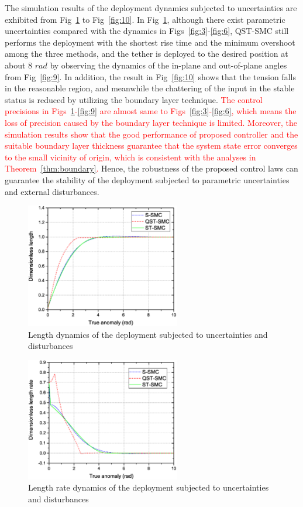 \documentclass[3p]{elsarticle}
\theoremstyle{plain}
\theoremstyle{remark}
\begin{document}
The simulation results of the deployment dynamics subjected to uncertainties are exhibited from Fig~\ref{fig:7} to Fig~\ref{fig:10}. In Fig~\ref{fig:7}, although there exist parametric uncertainties compared with the dynamics in Figs~\ref{fig:3}-\ref{fig:6}, QST-SMC still performs the deployment with the shortest rise time and the minimum overshoot among the three methods, and the tether is deployed to the desired position at about 8 $rad$ by observing the dynamics of the in-plane and out-of-plane angles from Fig~\ref{fig:9}. In addition, the result in Fig~\ref{fig:10} shows that the tension falls in the reasonable region, and meanwhile the chattering of the input in the stable status is reduced by utilizing the boundary layer technique. \textcolor{red}{The control precisions in Figs~\ref{fig:7}-\ref{fig:9} are almost same to Figs~\ref{fig:3}-\ref{fig:6}, which means the loss of precision caused by the boundary layer technique is limited. Moreover, the simulation results show that the good performance of proposed controller and the suitable boundary layer thickness guarantee that the system state error converges to the small vicinity of origin, which is consistent with the analyses in Theorem~\ref{thm:boundary}.} Hence, the robustness of the proposed control laws can guarantee the stability of the deployment subjected to parametric uncertainties and external disturbances.
\begin{figure}
\centering
\includegraphics[width=0.6\textwidth]{paper4_fig7_20161025.eps}
\caption{Length dynamics of the deployment subjected to uncertainties and disturbances}
\label{fig:7}
\end{figure}
\begin{figure}
\centering
\includegraphics[width=0.6\textwidth]{paper4_fig8_20161025.eps}
\caption{Length rate dynamics of the deployment subjected to uncertainties and disturbances}
\label{fig:8}
\end{figure}
\end{document}
